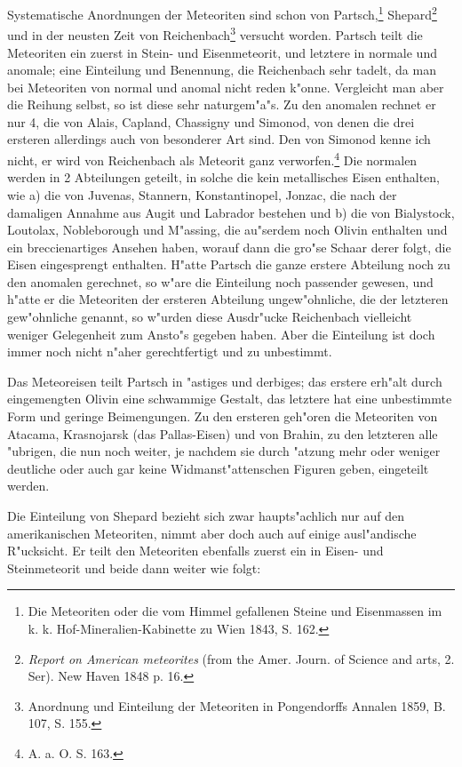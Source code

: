 \documentclass[a4paper, 11pt, oneside, german]{article}
\begin{document}
Systematische Anordnungen der Meteoriten sind schon von Partsch,\footnote{Die Meteoriten oder die vom Himmel gefallenen Steine und Eisenmassen im k. k. Hof-Mineralien-Kabinette zu Wien 1843, S. 162.} Shepard\footnote{\emph{Report on American meteorites} (from the Amer. Journ. of Science and arts, 2. Ser). New Haven 1848 p. 16.} und in der neusten Zeit von Reichenbach\footnote{Anordnung und Einteilung der Meteoriten in Pongendorffs Annalen 1859, B. 107, S. 155.} versucht worden. Partsch teilt die Meteoriten ein zuerst in Stein- und Eisenmeteorit, und letztere in normale und anomale; eine Einteilung und Benennung, die Reichenbach sehr tadelt, da man bei Meteoriten von normal und anomal nicht reden k"onne. Vergleicht man aber die Reihung selbst, so ist diese sehr naturgem"a"s. Zu den anomalen rechnet er nur 4, die von Alais, Capland, Chassigny und Simonod, von denen die drei ersteren allerdings auch von besonderer Art sind. Den von Simonod kenne ich nicht, er wird von Reichenbach als Meteorit ganz verworfen.\footnote{A. a. O. S. 163.} Die normalen werden in 2 Abteilungen geteilt, in solche die kein metallisches Eisen enthalten, wie a) die von Juvenas, Stannern, Konstantinopel, Jonzac, die nach der damaligen Annahme aus Augit und Labrador bestehen und b) die von Bialystock, Loutolax, Nobleborough und M"assing, die au"serdem noch Olivin enthalten und ein breccienartiges Ansehen haben, worauf dann die gro"se Schaar derer folgt, die Eisen eingesprengt enthalten. H"atte Partsch die ganze erstere Abteilung noch zu den anomalen gerechnet, so w"are die Einteilung noch passender gewesen, und h"atte er die Meteoriten der ersteren Abteilung ungew"ohnliche, die der letzteren gew"ohnliche genannt, so w"urden diese Ausdr"ucke Reichenbach vielleicht weniger Gelegenheit zum Ansto"s gegeben haben. Aber die Einteilung ist doch immer noch nicht n"aher gerechtfertigt und zu unbestimmt.

Das Meteoreisen teilt Partsch in "astiges und derbiges; das erstere erh"alt durch eingemengten Olivin eine schwammige Gestalt, das letztere hat eine unbestimmte Form und geringe Beimengungen. Zu den ersteren geh"oren die Meteoriten von Atacama, Krasnojarsk (das Pallas-Eisen) und von Brahin, zu den letzteren alle "ubrigen, die nun noch weiter, je nachdem sie durch "atzung mehr oder weniger deutliche oder auch gar keine Widmanst"attenschen Figuren geben, eingeteilt werden.

Die Einteilung von Shepard bezieht sich zwar haupts"achlich nur auf den amerikanischen Meteoriten, nimmt aber doch auch auf einige ausl"andische R"ucksicht. Er teilt den Meteoriten ebenfalls zuerst ein in Eisen- und Steinmeteorit und beide dann weiter wie folgt:
\end{document}
